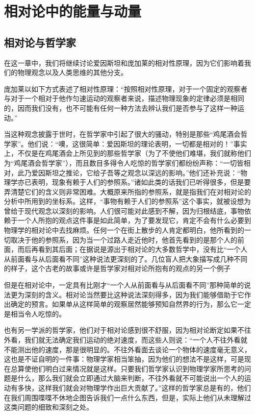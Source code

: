 \chapter{相对论中的能量与动量}

\section{相对论与哲学家}

在这一章中，我们将继续讨论爱因斯坦和庞加莱的相对性原理，因为它们影响着我们的物理观念以及人类思维的其他分支。

庞加莱以如下方式表述了相对性原理：“按照相对性原理，对于一个固定的观察者与对于一个相对于他作匀速运动的观察者来说，描述物理现象的定律必须是相同的，因而我们没有，也不可能有任何一种方法去辨认我们是否参与了这样一种运动。”

当这种观念披露于世时，在哲学家中引起了很大的骚动，特别是那些“鸡尾酒会哲学家”。他们说：“噢，这很简单：爱因斯坦的理论表明，一切都是相对的！”事实上，不仅是在鸡尾酒会上所见到的那些哲学家（为了不使他们难堪，我们就称他们为“鸡尾酒会哲学家”），而且数目多得令人吃惊的哲学家们都纷纷声称：“一切皆相对，此乃爱因斯坦之推论，它给子吾等之观念以深远的影响。”他们还补充说：“物理学亦已表明，现象有赖于人们的参照系。”诸如此类的话我们已听得很多，但是要弄清楚它们的含义则非常困难。大概原来所指的参照系，就是指我们在对相对论的分析中所用到的坐标系。这样，“事物有赖于人们的参照系”这个事实，就被设想为曾给于现代观念以深刻的影响。人们很可能对此感到不解，因为归根结底，事物依赖于一个人所抱的观点这件事是如此简单，为了要发现它，肯定不会有什么必要到物理学的相对论中去找麻烦。任何一个在街上散步的人肯定都明白，他所看到的一切取决于他的参照系，因为当一个过路人走近他时，他首先看到的是那个人的前面，而后再看到其后面；在据说是源出于相对论的大多数哲学中，没有比“一个人从前面看与从后面看不同”这种说法更深刻的了。几位盲人把大象描写成几种不同的样子，这个古老的故事或许是哲学家对相对论所抱有的观点的另一个例子

但是在相对论中，一定具有比刚才“一个人从前面看与从后面看不同”那种简单的说法更为深刻的含义。相对论当然要比这种说法深刻得多，因为我们能够借助于它作出确定的预言。如果单从这样简单的观察居然能够预知自然界的行为，那么它一定是相当令人吃惊的。

也有另一学派的哲学家，他们对于相对论感到很不舒服，因为相对论断定如果不往外看，我们就无法确定我们运动的绝对速度，而这些人则说：“一个人不往外看就不能测出他的速度，那是很明显的。不往外看面去谈论一个物体的速度毫无意义，这也是不证自明的一件事：物理学家相当笨抽，因为他们的想法不是这样，可是现在总算使他们明白过来情况就是这样。只要我们哲学家认识到物理学家所思考的问题是什么，那么我们就会立即通过大脑来判断，不往外看就不可能说出一个人的运动有多快，这样我们就会对物理学作出巨大贡献了。”这样的哲学家总是有的，他们在我们周围喋喋不休地企图告诉我们一点什么东西，但是，实际上他们从未理解过这类问题的细致和深刻之处。

